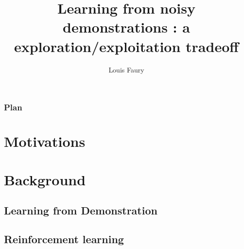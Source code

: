\documentclass[t]{beamer}
\begin{document}
\title[Learning from noisy demonstrations : a exploration/exploitation tradeoff]{Learning from noisy demonstrations : a exploration/exploitation tradeoff}
\author[Test]{Louis Faury}

\titlepage

\begin{frame}[t]
	\vspace{-3ex}
	\frametitle{Plan}
  	\tableofcontents
\end{frame}

\section{Motivations}
{
	\frame[t]
	{
	
	}
}

\section{Background}
{
	\subsection{Learning from Demonstration}
	{
		\frame[t]
		{
	
		}
	}
	\subsection{Reinforcement learning}
	{
		\frame[t]
		{
	
		}
	}
}
\end{document}
